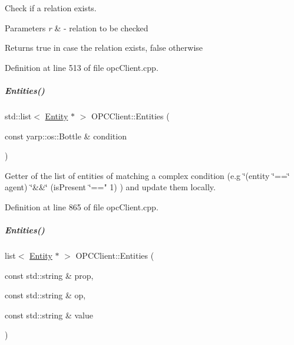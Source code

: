 Check if a relation exists. 


\begin{DoxyParams}{Parameters}
{\em r} & -\/ relation to be checked \\
\hline
\end{DoxyParams}
\begin{DoxyReturn}{Returns}
true in case the relation exists, false otherwise 
\end{DoxyReturn}


Definition at line 513 of file opc\+Client.\+cpp.

\mbox{\label{group__icubclient__clients_af4129eac8888d65d3142b15a7f17909c}} 
\subparagraph{\texorpdfstring{Entities()}{Entities()}\hspace{0.1cm}{\footnotesize\ttfamily [1/2]}}
{\footnotesize\ttfamily std\+::list$<$ \hyperlink{group__icubclient__representations_classicubclient_1_1Entity}{Entity} $\ast$ $>$ O\+P\+C\+Client\+::\+Entities (\begin{DoxyParamCaption}\item[{const yarp\+::os\+::\+Bottle \&}]{condition }\end{DoxyParamCaption})}



Getter of the list of entities of matching a complex condition (e.\+g \char`\"{}(entity \char`\"{}==\char`\"{} agent) \char`\"{}\&\&\char`\"{} (is\+Present \char`\"{}==" 1) ) and update them locally. 



Definition at line 865 of file opc\+Client.\+cpp.

\mbox{\label{group__icubclient__clients_a62ac8158ffa1f9d4d33ea15ea5403a15}} 
\subparagraph{\texorpdfstring{Entities()}{Entities()}\hspace{0.1cm}{\footnotesize\ttfamily [2/2]}}
{\footnotesize\ttfamily list$<$ \hyperlink{group__icubclient__representations_classicubclient_1_1Entity}{Entity} $\ast$ $>$ O\+P\+C\+Client\+::\+Entities (\begin{DoxyParamCaption}\item[{const std\+::string \&}]{prop,  }\item[{const std\+::string \&}]{op,  }\item[{const std\+::string \&}]{value }\end{DoxyParamCaption})}



